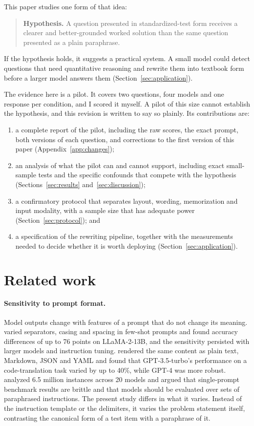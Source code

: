\documentclass[11pt]{article}
\begin{document}
This paper studies one form of that idea:
\begin{quote}\raggedright
\textbf{Hypothesis.} A question presented in standardized-test form receives a clearer and better-grounded worked solution than the same question presented as a plain paraphrase.
\end{quote}
If the hypothesis holds, it suggests a practical system. A small model could detect questions that need quantitative reasoning and rewrite them into textbook form before a larger model answers them (Section~\ref{sec:application}).

The evidence here is a pilot. It covers two questions, four models and one response per condition, and I scored it myself. A pilot of this size cannot establish the hypothesis, and this revision is written to say so plainly. Its contributions are:
\begin{enumerate}[label=(\arabic*)]
  \item a complete report of the pilot, including the raw scores, the exact prompt, both versions of each question, and corrections to the first version of this paper (Appendix~\ref{app:changes});
  \item an analysis of what the pilot can and cannot support, including exact small-sample tests and the specific confounds that compete with the hypothesis (Sections~\ref{sec:results} and~\ref{sec:discussion});
  \item a confirmatory protocol that separates layout, wording, memorization and input modality, with a sample size that has adequate power (Section~\ref{sec:protocol}); and
  \item a specification of the rewriting pipeline, together with the measurements needed to decide whether it is worth deploying (Section~\ref{sec:application}).
\end{enumerate}

\section{Related work}
\label{sec:related}

\paragraph{Sensitivity to prompt format.}
Model outputs change with features of a prompt that do not change its meaning. \citet{sclar2024quantifying} varied separators, casing and spacing in few-shot prompts and found accuracy differences of up to 76 points on LLaMA-2-13B, and the sensitivity persisted with larger models and instruction tuning. \citet{he2024formatting} rendered the same content as plain text, Markdown, JSON and YAML and found that GPT-3.5-turbo's performance on a code-translation task varied by up to 40\%, while GPT-4 was more robust. \citet{mizrahi2024state} analyzed 6.5 million instances across 20 models and argued that single-prompt benchmark results are brittle and that models should be evaluated over sets of paraphrased instructions. The present study differs in what it varies. Instead of the instruction template or the delimiters, it varies the problem statement itself, contrasting the canonical form of a test item with a paraphrase of it.
\end{document}
